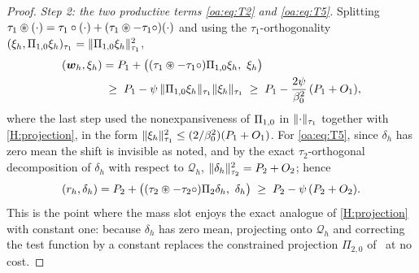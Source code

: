 \begin{proof}
\medskip\noindent\emph{Step 2: the two productive terms \cref{oa:eq:T2} and \cref{oa:eq:T5}.}
Splitting $\tau_1\circledast(\cdot) = \tau_1\circ(\cdot) + (\tau_1\circledast - \tau_1\circ)(\cdot)$
and using the $\tau_1$-orthogonality
$(\xi_h, \Pi_{1,0}\xi_h)_{\tau_1} = \lVert \Pi_{1,0}\xi_h \rVert_{\tau_1}^2$,
\[
\begin{aligned}
  (\bw_h, \xi_h)
  &= P_1 + \bigl((\tau_1\smul - \tau_1\pmul)\Ponez\xi_h,\ \xi_h\bigr) \\
  &\;\ge\; P_1 - \psi\,\norm{\Ponez\xi_h}_{\tau_1}\norm{\xi_h}_{\tau_1}
  \;\ge\; P_1 - \frac{2\psi}{\beta_0^2}\,(P_1 + O_1),
\end{aligned}
\]
where the last step used the nonexpansiveness of $\Pi_{1,0}$ in $\lVert \cdot \rVert_{\tau_1}$
together with \cref{H:projection}, in the form
$\lVert \xi_h \rVert_{\tau_1}^2 \le (2/\beta_0^2)(P_1 + O_1)$. For \cref{oa:eq:T5}, since
$\delta_h$ has zero mean the shift is invisible as noted, and by the exact
$\tau_2$-orthogonal decomposition of $\delta_h$ with respect to $\mathcal{Q}_h$,
$\lVert \delta_h \rVert_{\tau_2}^2 = P_2 + O_2$; hence
\[
  (r_h, \delta_h)
  = P_2 + \bigl((\tau_2\smul - \tau_2\pmul)\Ptwo\delta_h,\ \delta_h\bigr)
  \;\ge\; P_2 - \psi\,(P_2 + O_2).
\]
This is the point where the mass slot enjoys the exact analogue of \cref{H:projection} with
constant one: because $\delta_h$ has zero mean, projecting onto $\mathcal{Q}_h$ and correcting
the test function by a constant replaces the constrained projection
$\Pi_{2,0}$ of~\cite{codina2008analysis} at no cost.


\end{proof}
